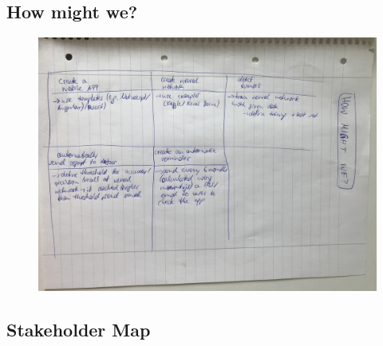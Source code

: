 \subsection{How might we?}

\begin{figure}[h]
\includegraphics[scale=0.55, natwidth=1024, natheight=200]{images/howmightwe.jpg}
\end{figure}


\subsection{Stakeholder Map}

%
%
%
%
%


